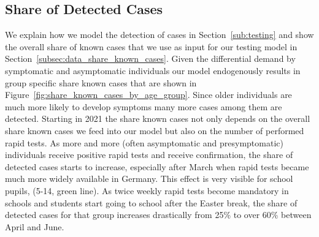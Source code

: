 \subsection{Share of Detected Cases}
\label{subsec:results_share_known_cases}

We explain how we model the detection of cases in Section~\ref{sub:testing} and show the
overall share of known cases that we use as input for our testing model in
Section~\ref{subsec:data_share_known_cases}.
Given the differential demand by symptomatic and asymptomatic individuals our model
endogenously results in group specific share known cases that are shown in
Figure~\ref{fig:share_known_cases_by_age_group}. Since older individuals are much more
likely to develop symptoms many more cases among them are detected.
Starting in 2021 the share known cases not only depends on the overall share known cases
we feed into our model but also on the number of performed rapid tests. As more and more
(often asymptomatic and presymptomatic) individuals receive positive rapid tests and
receive confirmation, the share of detected cases starts to increase, especially after
March when rapid tests became much more widely available in Germany. This effect is very
visible for school pupils, (5-14, green line). As twice weekly rapid tests become
mandatory in schools and students start going to school after the Easter break, the share
of detected cases for that group increases drastically from 25\% to over 60\% between
April and June.

